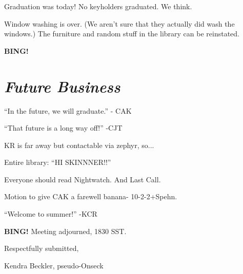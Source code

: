 \documentclass[10pt]{article}
\newcommand{\bing}{{\bf BING!} }
\newcommand{\goto}[1]{\bing \vskip 12pt \section*{{\em{#1}}}}
\begin{document}
Graduation was today!  No keyholders graduated.  We think.

Window washing is over.  (We aren't sure that they actually did wash the windows.)
The furniture and random stuff in the library can be reinstated.

\goto{Future Business}

``In the future, we will graduate.'' - CAK

``That future is a long way off!'' -CJT

KR is far away but contactable via zephyr, so...

Entire library: ``HI SKINNNER!!''

Everyone should read Nightwatch.  And Last Call.  

Motion to give CAK a farewell banana- 10-2-2+Spehn.

``Welcome to summer!'' -KCR

\bing
\noindent
Meeting adjourned, 1830 SST.

\vspace{18pt}

\centerline{Respectfully submitted,}
\centerline{Kendra Beckler, pseudo-Onseck}
\end{document}
